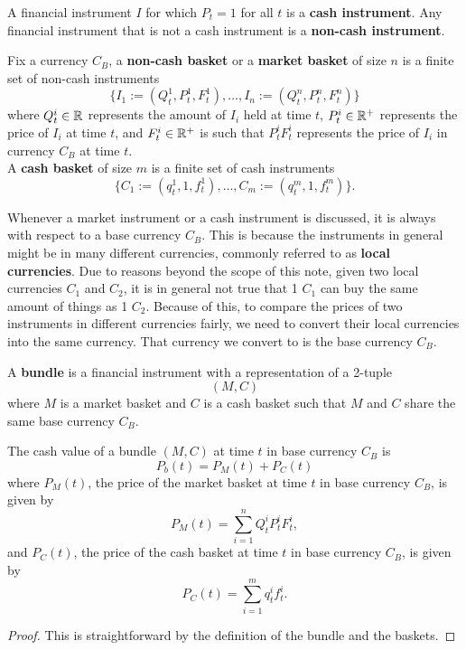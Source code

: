 \documentclass[11pt,fleqn]{book} %
\begin{document}
\begin{definition} \label{def:113}
A financial instrument \(I\) for which \(P_t = 1\) for all \(t\) is a \textbf{cash instrument}. Any financial
instrument that is not a cash instrument is a \textbf{non-cash instrument}.
\end{definition}

\begin{definition} \label{def:114}
Fix a currency \(C_B\), a \textbf{non-cash basket} or a \textbf{market basket} of size \(n\) is a finite set of non-cash instruments
\[
\{I_1 := (Q^1_t, P^1_t, F^1_t), \ldots, I_n := (Q_t^n, P_t^n, F_t^n)\}
\]
where \(Q_t^i \in \mathbb{R}\) represents the amount of \(I_i\) held at time \(t\), 
\(P_t^i \in \mathbb{R}^+\) represents the price of \(I_i\) at time \(t\), and \(F_t^i \in \mathbb{R}^+\) is 
such that \(P_t^iF_t^i\) represents the price of \(I_i\) in currency \(C_B\) at time \(t\).\\
A \textbf{cash basket} of size \(m\) is a finite set of cash instruments
\[
\{C_1 := (q_t^1, 1, f_t^1), \ldots, C_m := (q_t^m, 1, f_t^m)\}.
\]
\end{definition}

\begin{remark} \label{rmk:115}
Whenever a market instrument or a cash instrument is discussed, it is always with respect to a base currency 
\(C_B\). This is because the instruments in general might
be in many different currencies, commonly referred to as \textbf{local currencies}. Due to reasons beyond the 
scope of this note, given two local currencies \(C_1\) 
and \(C_2\), it is in general not true that 1 \(C_1\) can buy the same amount of things as 1 \(C_2\). Because of this, to compare the prices of two instruments in different
currencies fairly, we need to convert their local currencies into the same currency. That currency we convert to is the base currency \(C_B\).
\end{remark}

\begin{definition} \label{def:116}
A \textbf{bundle} is a financial instrument with a representation of a 2-tuple
\[
(M, C)
\]
where \(M\) is a market basket and \(C\) is a cash basket such that \(M\) and \(C\) share the same base currency \(C_B\).
\end{definition}

\begin{proposition} \label{prop:117}
The cash value of a bundle \((M, C)\) at time \(t\) in base currency \(C_B\) is
\[
P_b(t) = P_M(t) + P_C(t)
\]
where \(P_M(t)\), the price of the market basket at time \(t\) in base currency \(C_B\), is given by
\[
P_M(t) = \sum_{i=1}^n Q_t^iP_t^iF_t^i,
\]
and \(P_C(t)\), the price of the cash basket at time \(t\) in base currency \(C_B\), is given by
\[
P_C(t) = \sum_{i=1}^m q_t^if_t^i.
\]
\end{proposition}
\begin{proof}
This is straightforward by the definition of the bundle and the baskets.
\end{proof}
\end{document}
